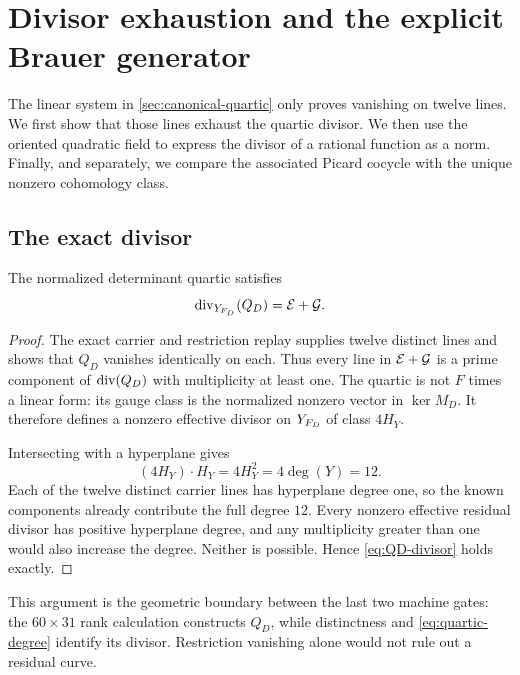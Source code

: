\section{Divisor exhaustion and the explicit Brauer generator}
\label{sec:quaternion}

The linear system in \cref{sec:canonical-quartic} only proves vanishing on
twelve lines.  We first show that those lines exhaust the quartic divisor.
We then use the oriented quadratic field to express the divisor of a rational
function as a norm.  Finally, and separately, we compare the associated
Picard cocycle with the unique nonzero cohomology class.

\subsection{The exact divisor}

\begin{proposition}
\label{prop:divisor-exhaustion}
The normalized determinant quartic satisfies
\begin{equation}
 \operatorname{div}_{Y_{F_D}}(Q_D)=\mathcal E+\mathcal G.
\label{eq:QD-divisor}
\end{equation}
\end{proposition}

\begin{proof}
The exact carrier and restriction replay supplies twelve distinct lines and
shows that \(Q_D\) vanishes identically on each.  Thus every line in
\(\mathcal E+\mathcal G\) is a prime component of \(\operatorname{div}(Q_D)\) with multiplicity at
least one.  The quartic is not \(F\) times a linear form: its gauge class is
the normalized nonzero vector in \(\ker M_D\).  It therefore defines a
nonzero effective divisor on \(Y_{F_D}\) of class \(4H_Y\).

Intersecting with a hyperplane gives
\begin{equation}
 (4H_Y)\cdot H_Y=4H_Y^2=4\deg(Y)=12.
\label{eq:quartic-degree}
\end{equation}
Each of the twelve distinct carrier lines has hyperplane degree one, so the
known components already contribute the full degree \(12\).  Every nonzero
effective residual divisor has positive hyperplane degree, and any
multiplicity greater than one would also increase the degree.  Neither is
possible.  Hence \cref{eq:QD-divisor} holds exactly.
\end{proof}

This argument is the geometric boundary between the last two machine gates:
the \(60\times31\) rank calculation constructs \(Q_D\), while distinctness
and \cref{eq:quartic-degree} identify its divisor.  Restriction vanishing
alone would not rule out a residual curve.

